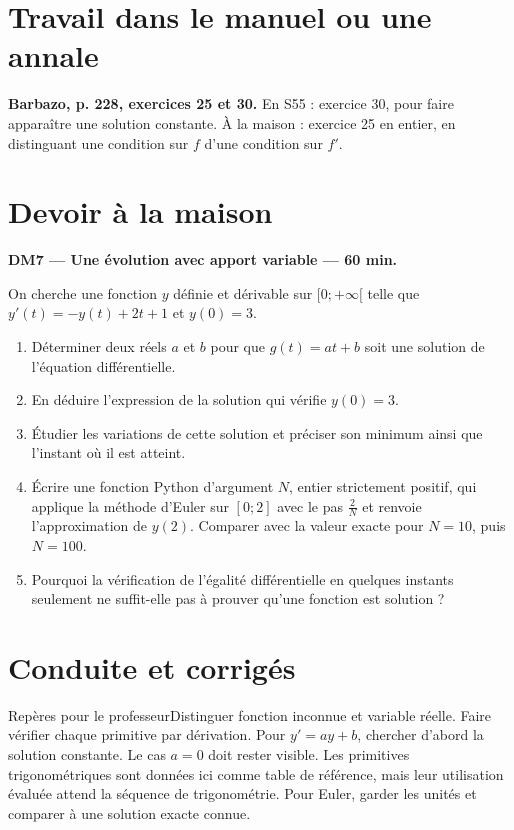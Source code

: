 \section{Travail dans le manuel ou une annale}\textbf{Barbazo, p. 228, exercices 25 et 30.} En S55 : exercice 30, pour faire apparaître une solution constante. À la maison : exercice 25 en entier, en distinguant une condition sur $f$ d'une condition sur $f'$.

\section{Devoir à la maison}\textbf{DM7 --- Une évolution avec apport variable --- 60 min.}\par On cherche une fonction $y$ définie et dérivable sur $[0;+\infty[$ telle que $y' (t)=-y(t)+2t+1$ et $y(0)=3$.
\begin{enumerate}\item Déterminer deux réels $a$ et $b$ pour que $g(t)=at+b$ soit une solution de l'équation différentielle.
\item En déduire l'expression de la solution qui vérifie $y(0)=3$.
\item Étudier les variations de cette solution et préciser son minimum ainsi que l'instant où il est atteint.
\item Écrire une fonction Python d'argument $N$, entier strictement positif, qui applique la méthode d'Euler sur $[0;2]$ avec le pas $\frac2N$ et renvoie l'approximation de $y(2)$. Comparer avec la valeur exacte pour $N=10$, puis $N=100$.
\item Pourquoi la vérification de l'égalité différentielle en quelques instants seulement ne suffit-elle pas à prouver qu'une fonction est solution ?\end{enumerate}

\ifprof\clearpage\section{Conduite et corrigés}\begin{profbox}{Repères pour le professeur}Distinguer fonction inconnue et variable réelle. Faire vérifier chaque primitive par dérivation. Pour $y'=ay+b$, chercher d'abord la solution constante. Le cas $a=0$ doit rester visible. Les primitives trigonométriques sont données ici comme table de référence, mais leur utilisation évaluée attend la séquence de trigonométrie. Pour Euler, garder les unités et comparer à une solution exacte connue.\end{profbox}

